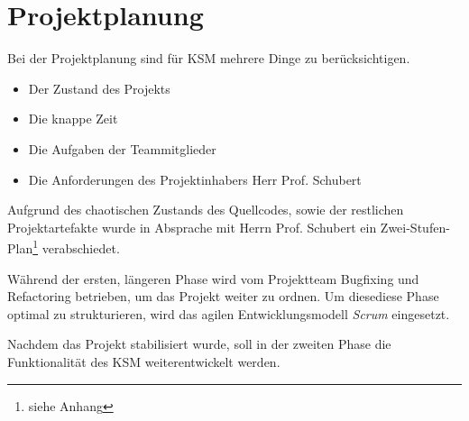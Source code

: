 \section{Projektplanung} \label{planung}

Bei der Projektplanung sind für KSM mehrere Dinge zu berücksichtigen. 
\begin{itemize}
\item Der Zustand des Projekts
\item Die knappe Zeit
\item Die Aufgaben der Teammitglieder
\item Die Anforderungen des Projektinhabers Herr Prof. Schubert
\end{itemize}

Aufgrund des chaotischen Zustands des Quellcodes, sowie der restlichen Projektartefakte wurde in Absprache mit Herrn Prof. Schubert ein Zwei-Stufen-Plan\footnote{siehe Anhang} verabschiedet. 

Während der ersten, längeren Phase wird vom Projektteam Bugfixing und Refactoring betrieben, um das Projekt weiter zu ordnen. Um diesediese Phase optimal zu strukturieren, wird das agilen Entwicklungsmodell \emph{Scrum} eingesetzt.

Nachdem das Projekt stabilisiert wurde, soll in der zweiten Phase die Funktionalität des KSM weiterentwickelt werden. 